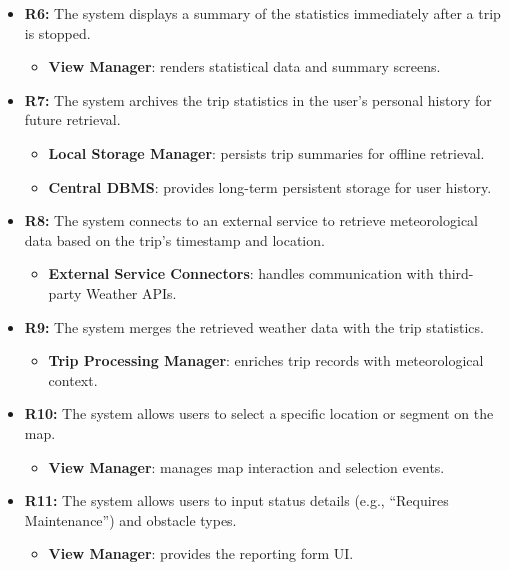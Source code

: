 \begin{itemize}
\begin{itemize}
          \end{itemize}
    \item \textbf{R6:} The system displays a summary of the statistics immediately after a trip is stopped.
          \begin{itemize}
              \item \textbf{View Manager}: renders statistical data and summary screens.
          \end{itemize}
    \item \textbf{R7:} The system archives the trip statistics in the user’s personal history for future retrieval.
          \begin{itemize}
              \item \textbf{Local Storage Manager}: persists trip summaries for offline retrieval.
              \item \textbf{Central DBMS}: provides long-term persistent storage for user history.
          \end{itemize}
    \item \textbf{R8:} The system connects to an external service to retrieve meteorological data based on the trip’s timestamp and location.
          \begin{itemize}
              \item \textbf{External Service Connectors}: handles communication with third-party Weather APIs.
          \end{itemize}
    \item \textbf{R9:} The system merges the retrieved weather data with the trip statistics.
          \begin{itemize}
              \item \textbf{Trip Processing Manager}: enriches trip records with meteorological context.
          \end{itemize}
    \item \textbf{R10:} The system allows users to select a specific location or segment on the map.
          \begin{itemize}
              \item \textbf{View Manager}: manages map interaction and selection events.
          \end{itemize}
    \item \textbf{R11:} The system allows users to input status details (e.g., “Requires Maintenance”) and obstacle types.
          \begin{itemize}
              \item \textbf{View Manager}: provides the reporting form UI.

\end{itemize}
\end{itemize}
